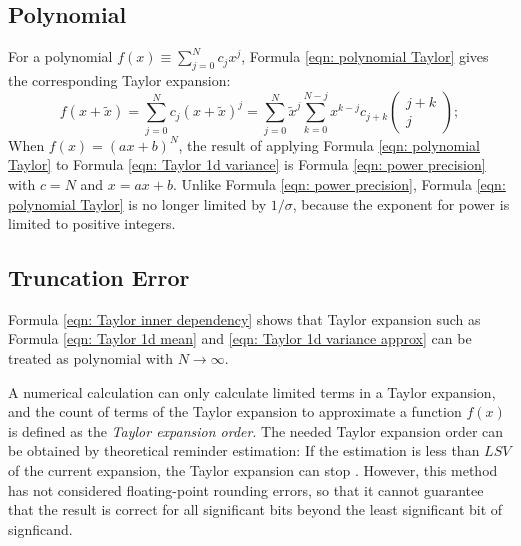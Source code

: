 \documentclass[twoside]{article}
\numberwithin{equation}{section}
\begin{document}
\fi

\subsection{Polynomial}

For a polynomial $f(x) \equiv \sum_{j=0}^{N} c_j x^j$, Formula \eqref{eqn: polynomial Taylor} gives the corresponding Taylor expansion:
\begin{equation}
\label{eqn: polynomial Taylor}
f(x + \tilde{x}) = \sum_{j=0}^{N} c_j (x + \tilde{x})^j = \sum_{j=0}^{N} \tilde{x}^{j} \sum_{k=0}^{N-j} x^{k - j} c_{j + k} \begin{pmatrix} j + k \\ j \end{pmatrix};
\end{equation}
When $f(x) = (ax + b)^N$, the result of applying Formula \eqref{eqn: polynomial Taylor} to Formula \eqref{eqn: Taylor 1d variance} is Formula \eqref{eqn: power precision} with $c=N$ and $x = ax + b$. 
Unlike Formula \eqref{eqn: power precision}, Formula \eqref{eqn: polynomial Taylor} is no longer limited by $1/\sigma$, because the exponent for power is limited to positive integers.



\subsection{Truncation Error}

Formula \eqref{eqn: Taylor inner dependency} shows that Taylor expansion such as Formula \eqref{eqn: Taylor 1d mean} and \eqref{eqn: Taylor 1d variance approx} can be treated as polynomial with $N \rightarrow \infty$.

A numerical calculation can only calculate limited terms in a Taylor expansion, and the count of terms of the Taylor expansion to approximate a function $f(x)$ is defined as the \emph{Taylor expansion order}.
The needed Taylor expansion order can be obtained by theoretical reminder estimation: If the estimation is less than $LSV$ of the current expansion, the Taylor expansion can stop \cite{Numerical_Recipes}.
However, this method has not considered floating-point rounding errors, so that it cannot guarantee that the result is correct for all significant bits beyond the least significant bit of signficand.
\end{document}
